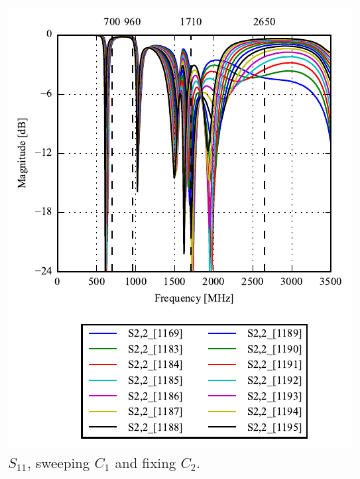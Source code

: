 \begin{figure}[htbp]
\begin{subfigure}[b]{0.49\linewidth}
        \includegraphics{img/tech_sol/monopole/play_mode/s22}
        \caption{$S_{11}$, sweeping $C_1$ and fixing $C_2$.}
        \label{fig:ant1_s22}
    \end{subfigure}
~
    \begin{subfigure}[b]{0.49\linewidth}
        \centering

\end{subfigure}
\end{figure}
